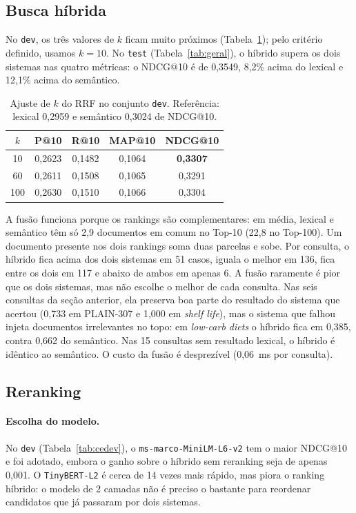 \documentclass[11pt,a4paper]{article}
\newcommand{\cod}[1]{\texttt{#1}}
\begin{document}
\FloatBarrier
\subsection{Busca híbrida}

No \cod{dev}, os três valores de $k$ ficam muito próximos (Tabela~\ref{tab:rrf}); pelo critério definido, usamos $k=10$. No \cod{test} (Tabela~\ref{tab:geral}), o híbrido supera os dois sistemas nas quatro métricas: o NDCG@10 é de 0,3549, 8,2\% acima do lexical e 12,1\% acima do semântico.

\begin{table}[!htb]
\centering\small
\caption{Ajuste de $k$ do RRF no conjunto \cod{dev}. Referência: lexical 0,2959 e semântico 0,3024 de NDCG@10.}
\label{tab:rrf}
\begin{tabular}{ccccc}
\toprule
$k$ & P@10 & R@10 & MAP@10 & NDCG@10 \\
\midrule
10 & 0,2623 & 0,1482 & 0,1064 & \textbf{0,3307} \\
60 & 0,2611 & 0,1508 & 0,1065 & 0,3291 \\
100 & 0,2630 & 0,1510 & 0,1066 & 0,3304 \\
\bottomrule
\end{tabular}
\end{table}

A fusão funciona porque os rankings são complementares: em média, lexical e semântico têm só 2,9 documentos em comum no Top-10 (22,8 no Top-100). Um documento presente nos dois rankings soma duas parcelas e sobe. Por consulta, o híbrido fica acima dos dois sistemas em 51 casos, iguala o melhor em 136, fica entre os dois em 117 e abaixo de ambos em apenas 6. A fusão raramente é pior que os dois sistemas, mas não escolhe o melhor de cada consulta. Nas seis consultas da seção anterior, ela preserva boa parte do resultado do sistema que acertou (0,733 em PLAIN-307 e 1,000 em \emph{shelf life}), mas o sistema que falhou injeta documentos irrelevantes no topo: em \emph{low-carb diets} o híbrido fica em 0,385, contra 0,662 do semântico. Nas 15 consultas sem resultado lexical, o híbrido é idêntico ao semântico. O custo da fusão é desprezível (0,06~ms por consulta).

\FloatBarrier
\subsection{Reranking}

\paragraph{Escolha do modelo.} No \cod{dev} (Tabela~\ref{tab:cedev}), o \cod{ms-marco-MiniLM-L6-v2} tem o maior NDCG@10 e foi adotado, embora o ganho sobre o híbrido sem reranking seja de apenas 0,001. O \cod{TinyBERT-L2} é cerca de 14 vezes mais rápido, mas piora o ranking híbrido: o modelo de 2 camadas não é preciso o bastante para reordenar candidatos que já passaram por dois sistemas.
\end{document}
